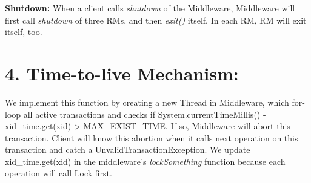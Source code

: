 \documentclass[a4paper, 12pt]{article}
\newcommand{\newQuestion}[1]{\section{#1}}
\begin{document}
\textbf{Shutdown:} When a client calls \textit{shutdown} of the Middleware, Middleware will first call \textit{shutdown} of three RMs, and then \textit{exit()} itself. In each RM, RM will exit itself, too.

\newQuestion{4. Time-to-live Mechanism:} We implement this function by creating a new Thread in Middleware, which for-loop all active transactions and checks if System.currentTimeMillis() - xid\_time.get(xid) > MAX\_EXIST\_TIME. If so, Middleware will abort this transaction. Client will know this abortion when it calls next operation on this transaction and catch a UnvalidTransactionException. We update xid\_time.get(xid) in the middleware's \textit{lockSomething} function because each operation will call Lock first.
\end{document}
